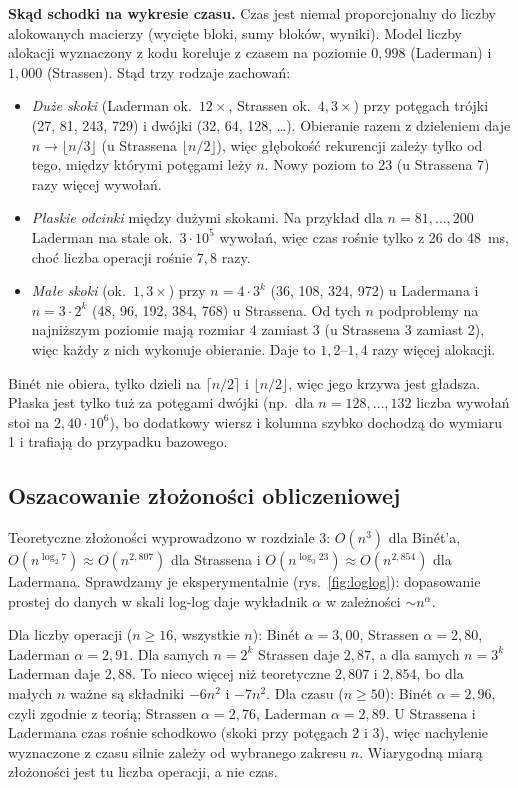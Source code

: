\documentclass[11pt,a4paper]{article}
\begin{document}
\textbf{Skąd schodki na wykresie czasu.} Czas jest niemal proporcjonalny do liczby alokowanych macierzy
(wycięte bloki, sumy bloków, wyniki). Model liczby alokacji wyznaczony z kodu koreluje z czasem na poziomie
$0{,}998$ (Laderman) i $1{,}000$ (Strassen). Stąd trzy rodzaje zachowań:
\begin{itemize}
\item \emph{Duże skoki} (Laderman ok.\ $12\times$, Strassen ok.\ $4{,}3\times$) przy potęgach trójki (27, 81, 243, 729)
i dwójki (32, 64, 128, \dots). Obieranie razem z dzieleniem daje $n\to\lfloor n/3\rfloor$ (u Strassena
$\lfloor n/2\rfloor$), więc głębokość rekurencji zależy tylko od tego, między którymi potęgami leży $n$.
Nowy poziom to 23 (u Strassena 7) razy więcej wywołań.
\item \emph{Płaskie odcinki} między dużymi skokami. Na przykład dla $n=81,\dots,200$ Laderman ma stale ok.\
$3\cdot10^{5}$ wywołań, więc czas rośnie tylko z 26 do 48~ms, choć liczba operacji rośnie $7{,}8$ razy.
\item \emph{Małe skoki} (ok.\ $1{,}3\times$) przy $n=4\cdot3^k$ (36, 108, 324, 972) u Ladermana i $n=3\cdot2^k$
(48, 96, 192, 384, 768) u Strassena. Od tych $n$ podproblemy na najniższym poziomie mają rozmiar 4 zamiast 3
(u Strassena 3 zamiast 2), więc każdy z nich wykonuje obieranie. Daje to $1{,}2$--$1{,}4$ razy więcej alokacji.
\end{itemize}
Binét nie obiera, tylko dzieli na $\lceil n/2\rceil$ i $\lfloor n/2\rfloor$, więc jego krzywa jest gładsza.
Płaska jest tylko tuż za potęgami dwójki (np.\ dla $n=128,\dots,132$ liczba wywołań stoi na $2{,}40\cdot10^{6}$),
bo dodatkowy wiersz i kolumna szybko dochodzą do wymiaru 1 i trafiają do przypadku bazowego.

\subsection{Oszacowanie złożoności obliczeniowej}
Teoretyczne złożoności wyprowadzono w rozdziale 3: $O(n^3)$ dla Binét'a, $O(n^{\log_2 7})\approx O(n^{2{,}807})$
dla Strassena i $O(n^{\log_3 23})\approx O(n^{2{,}854})$ dla Ladermana. Sprawdzamy je eksperymentalnie
(rys.~\ref{fig:loglog}): dopasowanie prostej do danych w skali log-log daje wykładnik $\alpha$ w zależności
$\sim n^{\alpha}$.

Dla liczby operacji ($n\ge16$, wszystkie $n$): Binét $\alpha=3{,}00$, Strassen $\alpha=2{,}80$, Laderman $\alpha=2{,}91$.
Dla samych $n=2^k$ Strassen daje $2{,}87$, a dla samych $n=3^k$ Laderman daje $2{,}88$. To nieco więcej niż teoretyczne
$2{,}807$ i $2{,}854$, bo dla małych $n$ ważne są składniki $-6n^2$ i $-7n^2$.
Dla czasu ($n\ge50$): Binét $\alpha=2{,}96$, czyli zgodnie z teorią; Strassen $\alpha=2{,}76$, Laderman $\alpha=2{,}89$.
U Strassena i Ladermana czas rośnie schodkowo (skoki przy potęgach 2 i 3), więc nachylenie wyznaczone z czasu silnie
zależy od wybranego zakresu $n$. Wiarygodną miarą złożoności
jest tu liczba operacji, a nie czas.
\end{document}
